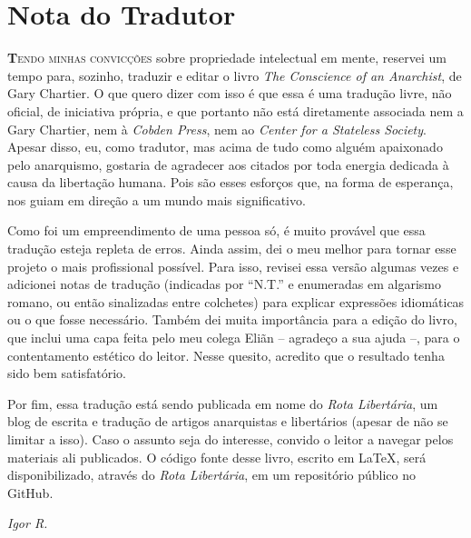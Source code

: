 
\chapter{Nota do Tradutor}

\lettrine[lines=2]{\textcolor{LettrineColor}{\textbf{T}}}{endo minhas convicções} sobre propriedade intelectual em mente, reservei um tempo para, sozinho, traduzir e editar o livro \emph{The Conscience of an Anarchist}, de Gary Chartier. O que quero dizer com isso é que essa é uma tradução livre, não oficial, de iniciativa própria, e que portanto não está diretamente associada nem a Gary Chartier, nem à \emph{Cobden Press}, nem ao \emph{Center for a Stateless Society}. Apesar disso, eu, como tradutor, mas acima de tudo como alguém apaixonado pelo anarquismo, gostaria de agradecer aos citados por toda energia dedicada à causa da libertação humana. Pois são esses esforços que, na forma de esperança, nos guiam em direção a um mundo mais significativo.

Como foi um empreendimento de uma pessoa só, é muito provável que essa tradução esteja repleta de erros. Ainda assim, dei o meu melhor para tornar esse projeto o mais profissional possível. Para isso, revisei essa versão algumas vezes e adicionei notas de tradução (indicadas por ``N.T.'' e enumeradas em algarismo romano, ou então sinalizadas entre colchetes) para explicar expressões idiomáticas ou o que fosse necessário. Também dei muita importância para a edição do livro, que inclui uma capa feita pelo meu colega Eliãn -- agradeço a sua ajuda --, para o contentamento estético do leitor. Nesse quesito, acredito que o resultado tenha sido bem satisfatório.

Por fim, essa tradução está sendo publicada em nome do \emph{Rota Libertária}, um blog de escrita e tradução de artigos anarquistas e libertários (apesar de não se limitar a isso). Caso o assunto seja do interesse, convido o leitor a navegar pelos materiais ali publicados. O código fonte desse livro, escrito em \LaTeX, será disponibilizado, através do \emph{Rota Libertária}, em um repositório público no GitHub.

\begin{flushright}
\large\emph{Igor R.}
\end{flushright}

